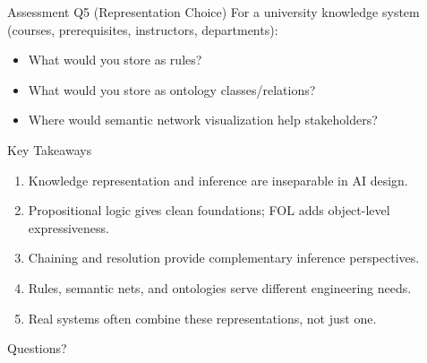 \documentclass[10pt]{beamer}
\begin{document}
\begin{frame}{Assessment Q5 (Representation Choice)}
    For a university knowledge system (courses, prerequisites, instructors, departments):
    \begin{itemize}
        \item What would you store as rules?
        \item What would you store as ontology classes/relations?
        \item Where would semantic network visualization help stakeholders?
    \end{itemize}
\end{frame}

\begin{frame}{Key Takeaways}
    \begin{enumerate}
        \item Knowledge representation and inference are inseparable in AI design.
        \item Propositional logic gives clean foundations; FOL adds object-level expressiveness.
        \item Chaining and resolution provide complementary inference perspectives.
        \item Rules, semantic nets, and ontologies serve different engineering needs.
        \item Real systems often combine these representations, not just one.
    \end{enumerate}
\end{frame}

\begin{frame}[standout]
    Questions?
\end{frame}
\end{document}
